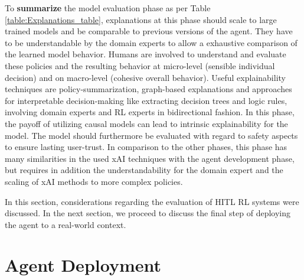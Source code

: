 \documentclass[twoside,11pt]{article}
\begin{document}
\noindent To \textbf{summarize} the model evaluation phase as per Table \ref{table:Explanations_table}, explanations at this phase should scale to large trained models and be comparable to previous versions of the agent. They have to be understandable by the domain experts to allow a exhaustive comparison of the learned model behavior. Humans are involved to understand and evaluate these policies and the resulting behavior at micro-level (sensible individual decision) and on macro-level (cohesive overall behavior). Useful explainability techniques are policy-summarization, graph-based explanations and approaches for interpretable decision-making like extracting decision trees and logic rules,  involving domain experts and RL experts in bidirectional fashion. In this phase, the payoff of utilizing causal models can lead to intrinsic explainability for the model. The model should furthermore be evaluated with regard to safety aspects to ensure lasting user-trust. In comparison to the other phases, this phase has many similarities in the used xAI techniques with the agent development phase, but requires in addition the understandability for the domain expert and the scaling of xAI methods to more complex policies.

In this section, considerations regarding the evaluation of HITL RL systems were discussed. In the next section, we proceed to discuss the final step of deploying the agent to a real-world context.

\section{Agent Deployment}
\label{sec:Deployment}
\end{document}
